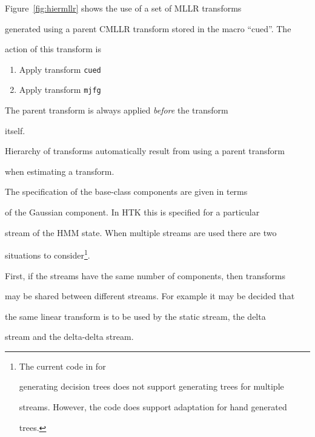 Figure~\ref{fig:hiermllr} shows the use of a set of MLLR transforms


generated using a parent CMLLR transform stored in the macro ``cued''. The


action of this transform is


\begin{enumerate}


\item Apply transform {\tt cued}


\item Apply transform {\tt mjfg}


\end{enumerate}


The parent transform is always applied {\it before} the transform


itself.





Hierarchy of transforms automatically result from using a parent transform


when estimating a transform. 







The specification of the base-class components are given in terms


of the Gaussian component. In HTK this is specified for a particular


stream of the HMM state. When multiple streams are used there are two 


situations to consider\footnote{The current code in  for 


generating decision trees does not support generating trees for multiple 


streams. However, the code does support adaptation for hand generated 


trees.}.





First, if the streams have the same number of components, then transforms


may be shared between different streams. For example it may be decided that


the same linear transform is to be used by the static stream, the delta


stream and the delta-delta stream.





